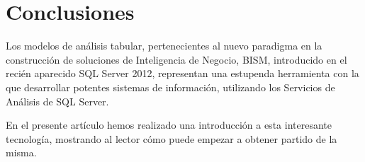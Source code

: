 \section{Conclusiones}

Los modelos de análisis tabular, pertenecientes al nuevo paradigma en la construcción de soluciones de Inteligencia de Negocio, BISM, introducido en el recién aparecido SQL Server 2012, representan una estupenda herramienta con la que desarrollar potentes sistemas de información, utilizando los Servicios de Análisis de SQL Server. 
\newline


En el presente artículo hemos realizado una introducción a esta interesante tecnología, mostrando al lector cómo puede empezar a obtener partido de la misma.
